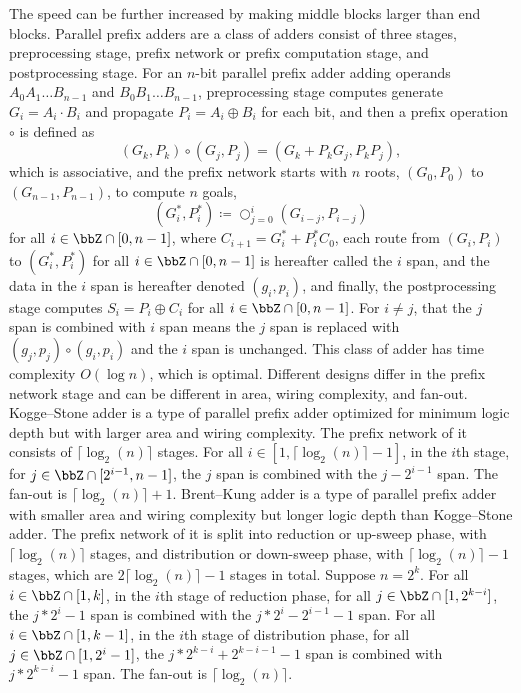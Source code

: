 \documentclass[a4paper,12pt]{report}
\begin{document}
The speed can be further increased by making middle blocks larger than end blocks.
Parallel prefix adders are a class of adders consist of three stages, preprocessing stage, prefix network or prefix computation stage, and postprocessing stage. For an $n$-bit parallel prefix adder adding operands $A_0A_1\ldots B_{n-1}$ and $B_0B_1\ldots B_{n-1}$, preprocessing stage computes generate $G_i=A_i\cdot B_i$ and propagate $P_i=A_i\oplus B_i$ for each bit, and then a prefix operation $\circ$ is defined as
\[(G_k,P_k)\circ (G_j,P_j)=(G_k+P_kG_j,P_kP_j),\]
which is associative, and the prefix network starts with $n$ roots, $(G_0,P_0)$ to $(G_{n-1},P_{n-1})$, to compute $n$ goals,
\[(G_i^*,P_i^*)\coloneq\bigcirc_{j=0}^i(G_{i-j},P_{i-j})\]
for all $i\in\bbZ\cap[0,n-1]$, where $C_{i+1}=G_i^*+P_i^*C_0$, each route from $(G_i,P_i)$ to $(G_i^*,P_i^*)$ for all $i\in\bbZ\cap[0,n-1]$ is hereafter called the $i$ span, and the data in the $i$ span is hereafter denoted $(g_i,p_i)$, and finally, the postprocessing stage computes $S_i=P_i\oplus C_i$ for all $i\in\bbZ\cap[0,n-1]$. For $i\ne j$, that the $j$ span is combined with $i$ span means the $j$ span is replaced with $(g_j,p_j)\circ(g_i,p_i)$ and the $i$ span is unchanged. This class of adder has time complexity $O(\log n)$, which is optimal. Different designs differ in the prefix network stage and can be different in area, wiring complexity, and fan-out.
Kogge–Stone adder is a type of parallel prefix adder optimized for minimum logic depth but with larger area and wiring complexity. The prefix network of it consists of $\lceil\log_2(n)\rceil$ stages. For all $i\in[1,\lceil\log_2(n)\rceil-1]$, in the $i$th stage, for $j\in\bbZ\cap[2^{i-1},n-1]$, the $j$ span is combined with the $j-2^{i-1}$ span. The fan-out is $\lceil\log_2(n)\rceil+1$.
Brent–Kung adder is a type of parallel prefix adder with smaller area and wiring complexity but longer logic depth than Kogge–Stone adder. The prefix network of it is split into reduction or up-sweep phase, with $\lceil\log_2(n)\rceil$ stages, and distribution or down-sweep phase, with $\lceil\log_2(n)\rceil-1$ stages, which are $2\lceil\log_2(n)\rceil-1$ stages in total. Suppose $n=2^k$. For all $i\in\bbZ\cap[1,k]$, in the $i$th stage of reduction phase, for all $j\in\bbZ\cap[1,2^{k-i}]$, the $j*2^i-1$ span is combined with the $j*2^i-2^{i-1}-1$ span. For all $i\in\bbZ\cap[1,k-1]$, in the $i$th stage of distribution phase, for all $j\in\bbZ\cap[1,2^i-1]$, the $j*2^{k-i}+2^{k-i-1}-1$ span is combined with $j*2^{k-i}-1$ span. The fan-out is $\lceil\log_2(n)\rceil$.
\end{document}
